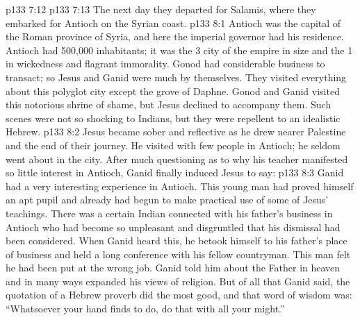 \vs p133 7:12 
\vs p133 7:13 \pc The next day they departed for Salamis, where they embarked for Antioch on the Syrian coast.
\vs p133 8:1 Antioch was the capital of the Roman province of Syria, and here the imperial governor had his residence. Antioch had 500,000 inhabitants; it was the 3 city of the empire in size and the 1 in wickedness and flagrant immorality. Gonod had considerable business to transact; so Jesus and Ganid were much by themselves. They visited everything about this polyglot city except the grove of Daphne. Gonod and Ganid visited this notorious shrine of shame, but Jesus declined to accompany them. Such scenes were not so shocking to Indians, but they were repellent to an idealistic Hebrew.
\vs p133 8:2 Jesus became sober and reflective as he drew nearer Palestine and the end of their journey. He visited with few people in Antioch; he seldom went about in the city. After much questioning as to why his teacher manifested so little interest in Antioch, Ganid finally induced Jesus to say: 
\vs p133 8:3 \pc Ganid had a very interesting experience in Antioch. This young man had proved himself an apt pupil and already had begun to make practical use of some of Jesus’ teachings. There was a certain Indian connected with his father’s business in Antioch who had become so unpleasant and disgruntled that his dismissal had been considered. When Ganid heard this, he betook himself to his father’s place of business and held a long conference with his fellow countryman. This man felt he had been put at the wrong job. Ganid told him about the Father in heaven and in many ways expanded his views of religion. But of all that Ganid said, the quotation of a Hebrew proverb did the most good, and that word of wisdom was: “Whatsoever your hand finds to do, do that with all your might.”
